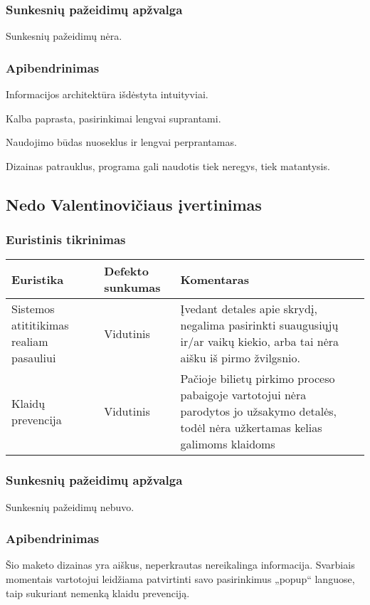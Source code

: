 \documentclass{VUMIFPSkursinis}
\begin{document}
\subsubsection{Sunkesnių pažeidimų apžvalga}
Sunkesnių pažeidimų nėra.

\subsubsection{Apibendrinimas}
Informacijos architektūra išdėstyta intuityviai.

Kalba paprasta, pasirinkimai lengvai suprantami.

Naudojimo būdas nuoseklus ir lengvai perprantamas.

Dizainas patrauklus, programa gali naudotis tiek neregys, tiek matantysis.

\subsection{Nedo Valentinovičiaus įvertinimas}
\subsubsection{Euristinis tikrinimas}
\begin{center}
 \begin{tabular}{|| p{4cm} | p{4cm} | p{8cm} ||} 
 \hline
 Euristika & Defekto sunkumas & Komentaras \\
 \hline\hline
 Sistemos atititikimas realiam pasauliui & Vidutinis & Įvedant detales apie skrydį, negalima pasirinkti suaugusiųjų ir/ar vaikų kiekio, arba tai nėra aišku iš pirmo žvilgsnio. \\ 
 \hline
 Klaidų prevencija & Vidutinis & Pačioje bilietų pirkimo proceso pabaigoje vartotojui nėra parodytos jo užsakymo detalės, todėl nėra užkertamas kelias galimoms klaidoms \\
 \hline
\end{tabular}	
\end{center}

\subsubsection{Sunkesnių pažeidimų apžvalga}
Sunkesnių pažeidimų nebuvo.

\subsubsection{Apibendrinimas}
Šio maketo dizainas yra aiškus, neperkrautas nereikalinga informacija. Svarbiais momentais vartotojui leidžiama patvirtinti savo pasirinkimus „popup“ languose, taip sukuriant nemenką klaidu prevenciją.
\end{document}
